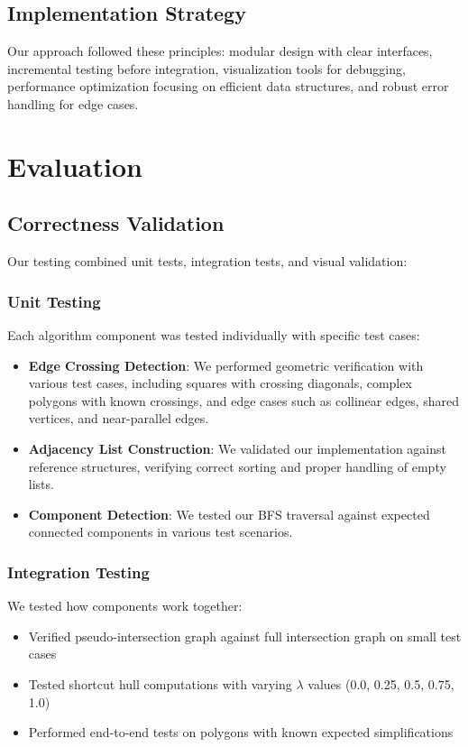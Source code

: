 \documentclass[11pt]{article}
\begin{document}
\subsection{Implementation Strategy}
Our approach followed these principles: modular design with clear interfaces, incremental testing before integration, visualization tools for debugging, performance optimization focusing on efficient data structures, and robust error handling for edge cases.


\section{Evaluation}

\subsection{Correctness Validation}

Our testing combined unit tests, integration tests, and visual validation:

\subsubsection{Unit Testing}
Each algorithm component was tested individually with specific test cases:

\begin{itemize}
    \item \textbf{Edge Crossing Detection}: We performed geometric verification with various test cases, including squares with crossing diagonals, complex polygons with known crossings, and edge cases such as collinear edges, shared vertices, and near-parallel edges.
    
    \item \textbf{Adjacency List Construction}: We validated our implementation against reference structures, verifying correct sorting and proper handling of empty lists.
    
    \item \textbf{Component Detection}: We tested our BFS traversal against expected connected components in various test scenarios.
\end{itemize}

\subsubsection{Integration Testing}
We tested how components work together:

\begin{itemize}
    \item Verified pseudo-intersection graph against full intersection graph on small test cases
    \item Tested shortcut hull computations with varying $\lambda$ values (0.0, 0.25, 0.5, 0.75, 1.0)
    \item Performed end-to-end tests on polygons with known expected simplifications
\end{itemize}
\end{document}
